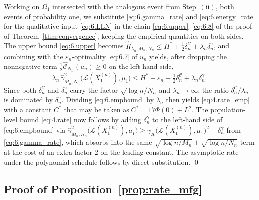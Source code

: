\documentclass[11pt,leqno]{article}
\theoremstyle{plain}
\theoremstyle{remark}
\theoremstyle{definition}
\numberwithin{equation}{section}
\numberwithin{figure}{section}
\numberwithin{table}{section}
\numberwithin{algorithm}{section}
\begin{document}
Working on $\Omega_1$ intersected with the analogous event from Step~$(\mathrm{ii})$, both events of probability one,
we substitute \eqref{eq:6.gamma_rate} and \eqref{eq:6.energy_rate} for the qualitative input \eqref{eq:6.LLN}
in the chain \eqref{eq:6.upper}--\eqref{eq:6.8} of the proof of Theorem~\ref{thm:convergence},
keeping the empirical quantities on both sides.
The upper bound \eqref{eq:6.upper} becomes
$\hat{H}_{\lambda_n,M_n,N_n}\le H^* + \tfrac{1}{2}\delta^{\mathcal{C}}_n + \lambda_n\delta^\gamma_n$,
and combining with the $\varepsilon_n$-optimality \eqref{eq:6.7} of $u_n$ yields, after dropping the nonnegative term $\tfrac{1}{2}\hat{\mathcal{C}}_{N_n}(u_n)\ge 0$ on the left-hand side,
\begin{equation}\label{eq:6.empbound}
 \lambda_n\,\hat{\gamma}_{M_n,N_n}^2\bigl(\mathcal{L}(X_1^{(n)}),\mu_1\bigr)
 \le H^* + \varepsilon_n + \tfrac{1}{2}\delta^{\mathcal{C}}_n + \lambda_n\delta^\gamma_n.
\end{equation}
Since both $\delta^{\mathcal{C}}_n$ and $\delta^\gamma_n$ carry the factor $\sqrt{\log n/N_n}$
and $\lambda_n\to\infty$, the ratio $\delta^{\mathcal{C}}_n/\lambda_n$ is dominated by $\delta^\gamma_n$.
Dividing \eqref{eq:6.empbound} by $\lambda_n$ then yields \eqref{eq:4.rate_emp}
with a constant $C^*$ that may be taken as $C^*=17\Phi(0)+L^2$.
The population-level bound \eqref{eq:4.rate} now follows by adding $\delta^\gamma_n$
to the left-hand side of \eqref{eq:6.empbound} via $\hat{\gamma}_{M_n,N_n}^2\bigl(\mathcal{L}(X_1^{(n)}),\mu_1\bigr)\ge \gamma_K\bigl(\mathcal{L}(X_1^{(n)}),\mu_1\bigr)^2 - \delta^\gamma_n$ from \eqref{eq:6.gamma_rate},
which absorbs into the same $\sqrt{\log n/M_n}+\sqrt{\log n/N_n}$ term at the cost of an extra factor $2$ on the leading constant.
The asymptotic rate under the polynomial schedule follows by direct substitution.
\qed


\subsection{Proof of Proposition~\ref{prop:rate_mfg}}\label{sec:6.3rate_mfg}
\end{document}
